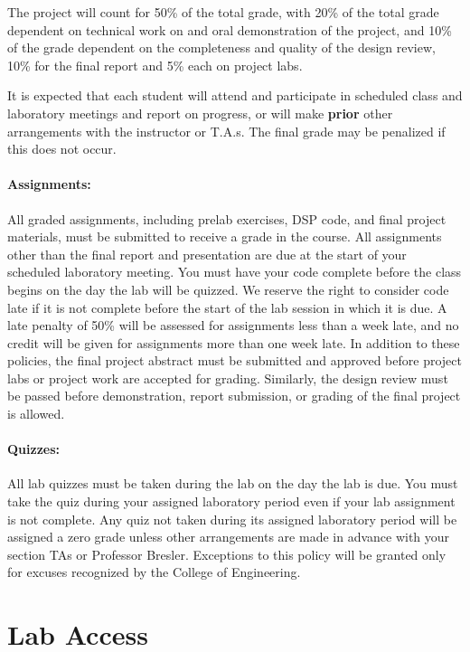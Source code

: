 \documentclass[11pt]{handout}
\begin{document}
The project will count for 50\% of the total
grade, with 20\% of the total grade dependent on technical work on
and oral demonstration of the
project, and 10\% of the grade dependent on the completeness and
quality of the design review, 10\% for the final report
and 5\% each on project labs. 

It is expected that each student will attend and participate in scheduled 
class and laboratory meetings and report on progress, or will make 
{\bf prior} other arrangements with the instructor or T.A.s.  The final grade 
may be penalized if this does not occur.  

\paragraph{Assignments:}  All graded assignments, including prelab exercises, 
DSP code, and final project materials, must be submitted to receive a grade 
in the course.  All assignments other than the final report and presentation 
are due at the start of your scheduled laboratory meeting.  You must have your 
code complete before the class begins on the day the lab will be quizzed.  
We reserve the right to consider code late if it is not complete before the 
start of the lab session in which it is due.  A late penalty of 50\% will be 
assessed for assignments less than a week late, and no credit will be given 
for assignments more than one week late.  In addition to these policies, the 
final project abstract must be submitted and approved before project labs or 
project work are accepted for grading.  Similarly, the design review must be 
passed before demonstration, report submission, or grading of the final project 
is allowed.

\paragraph{Quizzes:} All lab quizzes must be taken during the lab on the day 
the lab is due.  You must take the quiz during your assigned laboratory 
period even if your lab assignment is not complete.  Any quiz not taken during 
its assigned laboratory period will be assigned a zero grade unless other 
arrangements are made in advance with your section TAs or Professor Bresler.  
Exceptions to this policy will be granted only for excuses recognized 
by the College of Engineering.

\section{Lab Access}
\end{document}

